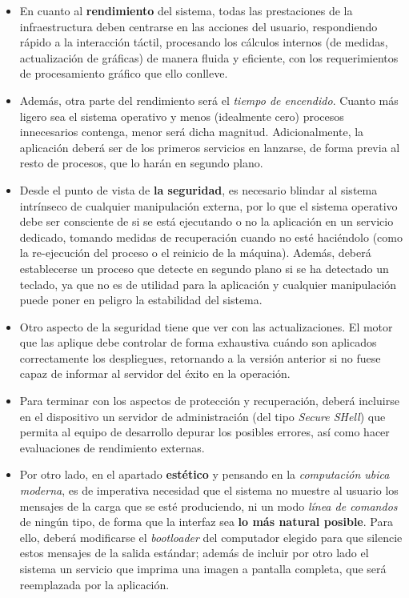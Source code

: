 \begin{itemize}
	\item En cuanto al \textbf{rendimiento} del sistema, todas las prestaciones de la infraestructura deben centrarse en las acciones del usuario, respondiendo rápido a la interacción táctil, procesando los cálculos internos (de medidas, actualización de gráficas) de manera fluida y eficiente, con los requerimientos de procesamiento gráfico que ello conlleve.
	\item Además, otra parte del rendimiento será el \textit{tiempo de encendido}. Cuanto más ligero sea el sistema operativo y menos (idealmente cero) procesos innecesarios contenga, menor será dicha magnitud. Adicionalmente, la aplicación deberá ser de los primeros servicios en lanzarse, de forma previa al resto de procesos, que lo harán en segundo plano.
	\item Desde el punto de vista de \textbf{la seguridad}, es necesario blindar al sistema intrínseco de cualquier manipulación externa, por lo que el sistema operativo debe ser consciente de si se está ejecutando o no la aplicación en un servicio dedicado, tomando medidas de recuperación cuando no esté haciéndolo (como la re-ejecución del proceso o el reinicio de la máquina). Además, deberá establecerse un proceso que detecte en segundo plano si se ha detectado un teclado, ya que no es de utilidad para la aplicación y cualquier manipulación puede poner en peligro la estabilidad del sistema.
	\item Otro aspecto de la seguridad tiene que ver con las actualizaciones. El motor que las aplique debe controlar de forma exhaustiva cuándo son aplicados correctamente los despliegues, retornando a la versión anterior si no fuese capaz de informar al servidor del éxito en la operación.
	\item Para terminar con los aspectos de protección y recuperación, deberá incluirse en el dispositivo un servidor de administración (del tipo \textit{Secure SHell}) que permita al equipo de desarrollo depurar los posibles errores, así como hacer evaluaciones de rendimiento externas.
	\item Por otro lado, en el apartado \textbf{estético} y pensando en la \textit{computación ubica moderna}, es de imperativa necesidad que el sistema no muestre al usuario los mensajes de la carga que se esté produciendo, ni un modo \textit{línea de comandos} de ningún tipo, de forma que la interfaz sea \textbf{lo más natural posible}. Para ello, deberá modificarse el \textit{bootloader} del computador elegido para que silencie estos mensajes de la salida estándar; además de incluir por otro lado el sistema un servicio que imprima una imagen a pantalla completa, que será reemplazada por la aplicación.
\end{itemize}


